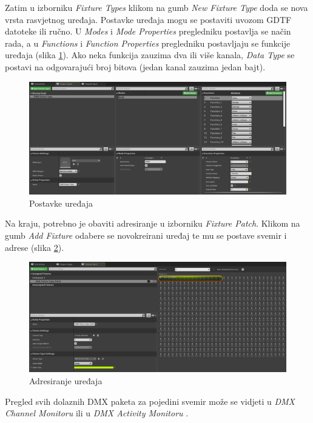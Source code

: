 \documentclass[times, utf8, zavrsni, numeric]{fer}
\begin{document}
Zatim u izborniku \emph{Fixture Types} klikom na gumb \emph{New Fixture Type} doda se nova vrsta rasvjetnog uređaja. Postavke uređaja mogu se postaviti uvozom GDTF datoteke ili ručno. U \emph{Modes} i \emph{Mode Properties} pregledniku postavlja se način rada, a u \emph{Functions} i \emph{Function Properties} pregledniku postavljaju se funkcije uređaja (slika \ref{fig:slika 6-2}). Ako neka funkcija zauzima dva ili više kanala, \emph{Data Type} se postavi na odgovarajući broj bitova (jedan kanal zauzima jedan bajt).

\begin{figure}[htp]
	\centering
	\includegraphics[width=\linewidth]{slika 6-2.png}
	\caption{Postavke uređaja}
	\label{fig:slika 6-2}
\end{figure}

Na kraju, potrebno je obaviti adresiranje u izborniku \emph{Fixture Patch}. Klikom na gumb \emph{Add Fixture} odabere se novokreirani uređaj te mu se postave svemir i adrese (slika \ref{fig:slika 6-3}).

\begin{figure}[htp]
	\centering
	\includegraphics[width=\linewidth]{slika 6-3.png}
	\caption{Adresiranje uređaja}
	\label{fig:slika 6-3}
\end{figure}

Pregled svih dolaznih DMX paketa za pojedini svemir može se vidjeti u \emph{DMX Channel Monitoru} ili u \emph{DMX Activity Monitoru} \cite{dmx_quickstart}.\newline
\end{document}
